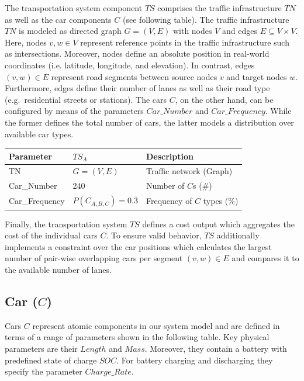 The transportation system component $TS$ comprises the traffic infrastructure $TN$ as well as the car components $C$ (see following table). The traffic infrastructure $TN$ is modeled as directed graph $G = (V,E)$ with nodes $V$ and edges $E \subseteq V \times V$. Here, nodes $v,w \in V$ represent reference points in the traffic infrastructure such as intersections. Moreover, nodes define an absolute position in real-world coordinates (i.e. latitude, longitude, and elevation). In contrast, edges $(v,w) \in E$ represent road segments between source nodes $v$ and target nodes $w$. Furthermore, edges define their number of lanes as well as their road type (e.g.\ residential streets or stations). The cars $C$, on the other hand, can be configured by means of the parameters $Car\_Number$ and $Car\_Frequency$. While the former defines the total number of cars, the latter models a distribution over available car types. 

\begin{table}[h]
	\renewcommand{\arraystretch}{1.3}
	\centering
	\begin{tabularx}{\columnwidth}{llX}
		\hline
		\textbf{Parameter}     & \textbf{$TS_{A}$}         & \textbf{Description} \\ \hline
		TN              & $G = (V, E)$    & Traffic network (Graph)    \\
		Car\_Number            & $240$    & Number of $C$s (\#)      \\ 
		Car\_Frequency      & $P(C_{A,B,C}) = 0.\overline{3}$    & Frequency of $C$ types (\%)       \\ \hline
	\end{tabularx}
\end{table}

Finally, the transportation system $TS$ defines a cost output which aggregates the cost of the individual cars $C$. To ensure valid behavior, $TS$ additionally implements a constraint over the car positions which calculates the largest number of pair-wise overlapping cars per segment $(v,w) \in E$ and compares it to the available number of lanes.

\subsection{Car ($C$)}
\label{section:car}

Cars $C$ represent atomic components in our system model and are defined in terms of a range of parameters shown in the following table. Key physical parameters are their $Length$ and $Mass$. Moreover, they contain a battery with predefined state of charge $SOC$. For battery charging and discharging they specify the parameter $Charge\_Rate$.

